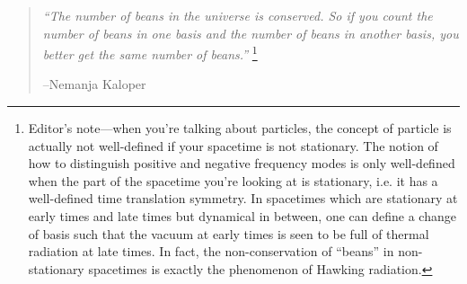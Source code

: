 \begin{quote}
    \textit{``The number of beans in the universe is conserved. So if you count the number of beans in one basis and the number of beans in another basis, you better get the same number of beans.''}%
        \footnote{Editor's note---when you're talking about particles, the concept of particle is actually not well-defined if your spacetime is not stationary. The notion of how to distinguish positive and negative frequency modes is only well-defined when the part of the spacetime you're looking at is stationary, i.e. it has a well-defined time translation symmetry. In spacetimes which are stationary at early times and late times but dynamical in between, one can define a change of basis such that the vacuum at early times is seen to be full of thermal radiation at late times. In fact, the non-conservation of ``beans'' in non-stationary spacetimes is exactly the phenomenon of Hawking radiation.}
    
    --Nemanja Kaloper
\end{quote}

